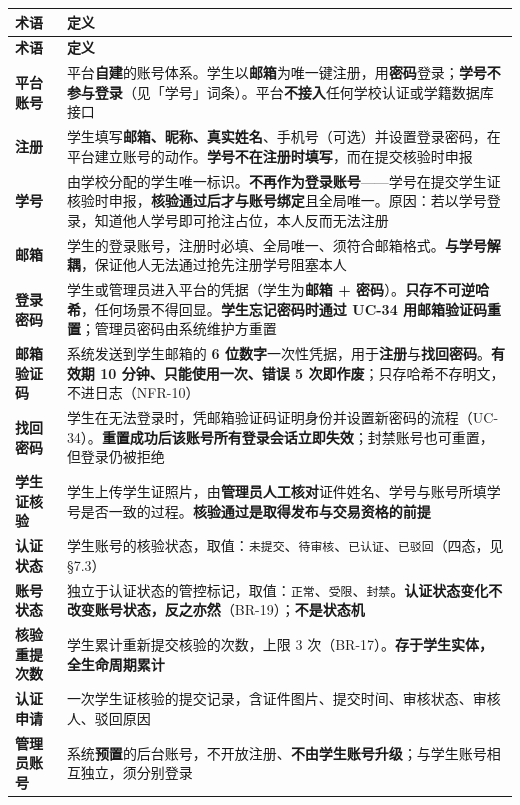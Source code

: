 \documentclass[12pt,a4paper]{ctexart}
\begin{document}
{\scriptsize
\begin{longtable}{|p{2.75cm}|p{13.25cm}|}
\hline
\textbf{术语} & \textbf{定义} \\
\hline
\endfirsthead
\hline
\textbf{术语} & \textbf{定义} \\
\hline
\endhead
\hline
\endfoot
\textbf{平台账号} & 平台\textbf{自建}的账号体系。学生以\textbf{邮箱}为唯一键注册，用\textbf{密码}登录；\textbf{学号不参与登录}（见「学号」词条）。平台\textbf{不接入}任何学校认证或学籍数据库接口 \\
\hline
\textbf{注册} & 学生填写\textbf{邮箱、昵称、真实姓名}、手机号（可选）并设置登录密码，在平台建立账号的动作。\textbf{学号不在注册时填写}，而在提交核验时申报 \\
\hline
\textbf{学号} & 由学校分配的学生唯一标识。\textbf{不再作为登录账号}——学号在提交学生证核验时申报，\textbf{核验通过后才与账号绑定}且全局唯一。原因：若以学号登录，知道他人学号即可抢注占位，本人反而无法注册 \\
\hline
\textbf{邮箱} & 学生的登录账号，注册时必填、全局唯一、须符合邮箱格式。\textbf{与学号解耦}，保证他人无法通过抢先注册学号阻塞本人 \\
\hline
\textbf{登录密码} & 学生或管理员进入平台的凭据（学生为\textbf{邮箱 + 密码}）。\textbf{只存不可逆哈希}，任何场景不得回显。\textbf{学生忘记密码时通过 UC-34 用邮箱验证码重置}；管理员密码由系统维护方重置 \\
\hline
\textbf{邮箱验证码} & 系统发送到学生邮箱的 \textbf{6 位数字}一次性凭据，用于\textbf{注册}与\textbf{找回密码}。\textbf{有效期 10 分钟、只能使用一次、错误 5 次即作废}；只存哈希不存明文，不进日志（NFR-10） \\
\hline
\textbf{找回密码} & 学生在无法登录时，凭邮箱验证码证明身份并设置新密码的流程（UC-34）。\textbf{重置成功后该账号所有登录会话立即失效}；封禁账号也可重置，但登录仍被拒绝 \\
\hline
\textbf{学生证核验} & 学生上传学生证照片，由\textbf{管理员人工核对}证件姓名、学号与账号所填学号是否一致的过程。\textbf{核验通过是取得发布与交易资格的前提} \\
\hline
\textbf{认证状态} & 学生账号的核验状态，取值：\texttt{未提交}、\texttt{待审核}、\texttt{已认证}、\texttt{已驳回}（四态，见 §7.3） \\
\hline
\textbf{账号状态} & 独立于认证状态的管控标记，取值：\texttt{正常}、\texttt{受限}、\texttt{封禁}。\textbf{认证状态变化不改变账号状态，反之亦然}（BR-19）；\textbf{不是状态机} \\
\hline
\textbf{核验重提次数} & 学生累计重新提交核验的次数，上限 3 次（BR-17）。\textbf{存于学生实体，全生命周期累计} \\
\hline
\textbf{认证申请} & 一次学生证核验的提交记录，含证件图片、提交时间、审核状态、审核人、驳回原因 \\
\hline
\textbf{管理员账号} & 系统\textbf{预置}的后台账号，不开放注册、\textbf{不由学生账号升级}；与学生账号相互独立，须分别登录 \\
\hline
\end{longtable}
}
\end{document}
